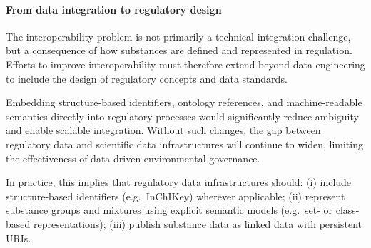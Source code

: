 \paragraph{From data integration to regulatory design}

The interoperability problem is not primarily a technical integration challenge, but a consequence of how substances are defined and represented in regulation. Efforts to improve interoperability must therefore extend beyond data engineering to include the design of regulatory concepts and data standards.

Embedding structure-based identifiers, ontology references, and machine-readable semantics directly into regulatory processes would significantly reduce ambiguity and enable scalable integration. Without such changes, the gap between regulatory data and scientific data infrastructures will continue to widen, limiting the effectiveness of data-driven environmental governance.

In practice, this implies that regulatory data infrastructures should:
(i) include structure-based identifiers (e.g.\ InChIKey) wherever applicable;
(ii) represent substance groups and mixtures using explicit semantic models (e.g.\ set- or class-based representations);
(iii) publish substance data as linked data with persistent URIs.